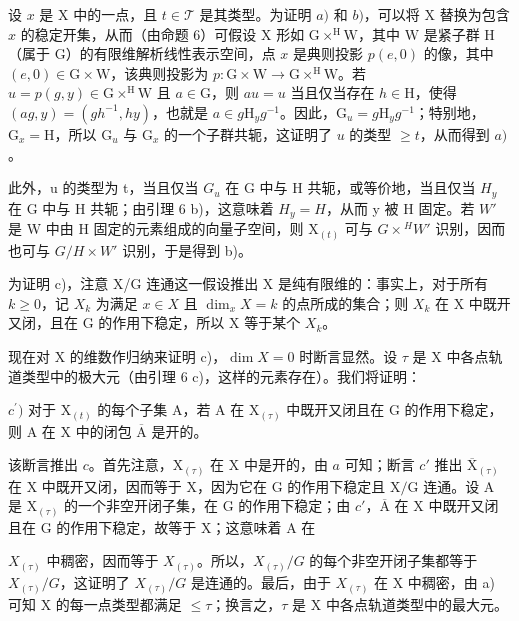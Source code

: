 设 \(x\) 是 \(\mathrm{X}\) 中的一点，且 \(t \in \mathcal{T}\) 是其类型。为证明 \(a)\) 和 \(b)\)，可以将 \(\mathrm{X}\) 替换为包含 \(x\) 的稳定开集，从而（由命题 6）可假设 \(\mathrm{X}\) 形如 \(\mathrm{G} \times^{\mathrm{H}}\mathrm{W}\)，其中 \(\mathrm{W}\) 是紧子群 \(\mathrm{H}\)（属于 \(\mathrm{G}\)）的有限维解析线性表示空间，点 \(x\) 是典则投影 \(p(e,0)\) 的像，其中 \((e,0) \in \mathrm{G} \times \mathrm{W}\)，该典则投影为 \(p: \mathrm{G} \times \mathrm{W} \to \mathrm{G} \times^{\mathrm{H}}\mathrm{W}\)。若 \(u = p(g,y) \in \mathrm{G} \times^{\mathrm{H}}\mathrm{W}\) 且 \(a \in \mathrm{G}\)，则 \(au = u\) 当且仅当存在 \(h \in \mathrm{H}\)，使得 \((ag,y) = (gh^{-1},hy)\)，也就是 \(a \in g\mathrm{H}_yg^{-1}\)。因此，\(\mathrm{G}_u = g\mathrm{H}_yg^{-1}\)；特别地，\(\mathrm{G}_x = \mathrm{H}\)，所以 \(\mathrm{G}_u\) 与 \(\mathrm{G}_x\) 的一个子群共轭，这证明了 \(u\) 的类型 \(\geq t\)，从而得到 \(a)\)。

此外，u 的类型为 t，当且仅当 \(G_{u}\) 在 G 中与 H 共轭，或等价地，当且仅当 \(H_{y}\) 在 G 中与 H 共轭；由引理 6 b)，这意味着 \(H_{y} = H\)，从而 y 被 H 固定。若 \(W'\) 是 W 中由 H 固定的元素组成的向量子空间，则 \(\mathrm{X}_{(t)}\) 可与 \(G \times {}^{H}W'\) 识别，因而也可与 \(G/H \times W'\) 识别，于是得到 b)。

为证明 c)，注意 X/G 连通这一假设推出 X 是纯有限维的：事实上，对于所有 \(k \geq 0\)，记 \(X_{k}\) 为满足 \(x \in X\) 且 \(\dim_{x} X = k\) 的点所成的集合；则 \(X_{k}\) 在 X 中既开又闭，且在 G 的作用下稳定，所以 X 等于某个 \(X_{k}\)。

现在对 X 的维数作归纳来证明 c)，\(\dim X = 0\) 时断言显然。设 \(\tau\) 是 X 中各点轨道类型中的极大元（由引理 6 c)，这样的元素存在）。我们将证明：

\(c^{\prime})\) 对于 \(\mathrm{X}_{(t)}\) 的每个子集 A，若 A 在 \(\mathrm{X}_{(\tau)}\) 中既开又闭且在 G 的作用下稳定，则 A 在 X 中的闭包 \(\overline{\mathrm{A}}\) 是开的。

该断言推出 \(c\)。首先注意，\(\mathrm{X}_{(\tau)}\) 在 \(\mathrm{X}\) 中是开的，由 \(a\) 可知；断言 \(c'\) 推出 \(\overline{\mathrm{X}}_{(\tau)}\) 在 \(\mathrm{X}\) 中既开又闭，因而等于 \(\mathrm{X}\)，因为它在 \(\mathrm{G}\) 的作用下稳定且 \(\mathrm{X} / \mathrm{G}\) 连通。设 \(\mathrm{A}\) 是 \(\mathrm{X}_{(\tau)}\) 的一个非空开闭子集，在 \(\mathrm{G}\) 的作用下稳定；由 \(c'\)，\(\overline{\mathrm{A}}\) 在 \(\mathrm{X}\) 中既开又闭且在 \(\mathrm{G}\) 的作用下稳定，故等于 \(\mathrm{X}\)；这意味着 \(\mathrm{A}\) 在

\(X_{(\tau)}\) 中稠密，因而等于 \(X_{(\tau)}\)。所以，\(X_{(\tau)}/G\) 的每个非空开闭子集都等于 \(X_{(\tau)}/G\)，这证明了 \(X_{(\tau)}/G\) 是连通的。最后，由于 \(X_{(\tau)}\) 在 X 中稠密，由 a) 可知 X 的每一点类型都满足 \(\leq \tau\)；换言之，\(\tau\) 是 X 中各点轨道类型中的最大元。

